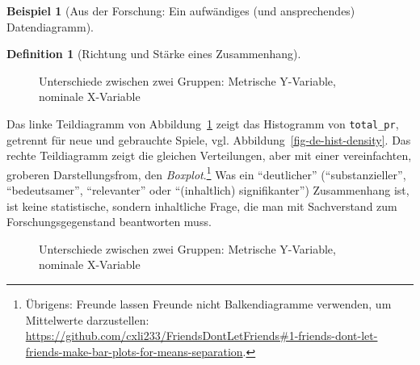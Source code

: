\documentclass[
  a4paper,
]{scrbook}
\theoremstyle{definition}
\newtheorem{example}{Beispiel}[chapter]
\theoremstyle{definition}
\newtheorem{definition}{Definition}[chapter]
\theoremstyle{definition}
\theoremstyle{remark}
\begin{document}
\begin{example}[Aus der Forschung: Ein aufwändiges (und ansprechendes)
Datendiagramm]
\begin{definition}[Richtung und Stärke eines
Zusammenhang]
\begin{figure}
\begin{minipage}{0.50\linewidth}
\end{minipage}%
%
\begin{minipage}{0.50\linewidth}



\end{minipage}%

\caption{\label{fig-compare-groups1}Unterschiede zwischen zwei Gruppen:
Metrische Y-Variable, nominale X-Variable}

\end{figure}%

Das linke Teildiagramm von Abbildung~\ref{fig-compare-groups1} zeigt das
Histogramm von \texttt{total\_pr}, getrennt für neue und gebrauchte
Spiele, vgl. Abbildung~\ref{fig-de-hist-density}. Das rechte
Teildiagramm zeigt die gleichen Verteilungen, aber mit einer
vereinfachten, groberen Darstellungsfrom, den \emph{Boxplot}.\footnote{Übrigens:
  Freunde lassen Freunde nicht Balkendiagramme verwenden, um Mittelwerte
  darzustellen:
  \url{https://github.com/cxli233/FriendsDontLetFriends\#1-friends-dont-let-friends-make-bar-plots-for-means-separation}.}
Was ein ``deutlicher'' (``substanzieller'', ``bedeutsamer'',
``relevanter'' oder ``(inhaltlich) signifikanter'') Zusammenhang ist,
ist keine statistische, sondern inhaltliche Frage, die man mit
Sachverstand zum Forschungsgegenstand beantworten muss.

\begin{figure}

\begin{minipage}{0.50\linewidth}
Unterschiede zwischen zwei Gruppen: Metrische Y-Variable, nominale
X-Variable\end{minipage}%


\end{figure}
\end{definition}
\end{example}
\end{document}
